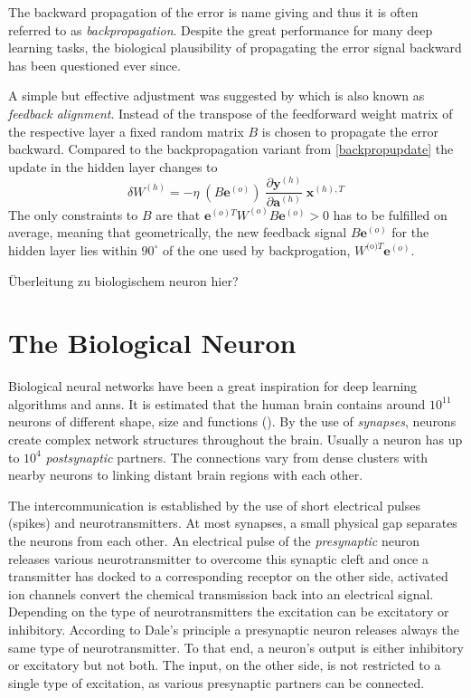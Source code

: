 The backward propagation of the error is name giving and thus it is often referred to as \textit{backpropagation}. Despite the great performance for many deep learning tasks, the biological plausibility of propagating the error signal backward has been questioned ever since.

A simple but effective adjustment was suggested by \cite{lillicrap2016random} which is also known as \textit{feedback alignment}. Instead of the transpose of the feedforward weight matrix of the respective layer a fixed random matrix $B$ is chosen to propagate the error backward. Compared to the backpropagation variant from \cref{backpropupdate} the update in the hidden layer changes to
\begin{equation}
\delta W^{(h)} = - \eta \;
(B \mathbf{e}^{(o)}) \;
\frac{\partial \mathbf{y}^{(h)}}{\partial \mathbf{a}^{(h)}} \;
\mathbf{x}^{(h),T}
\end{equation}
The only constraints to $B$ are that $\mathbf{e}^{(o)T} W^{(o)} B \mathbf{e}^{(o)} > 0$ has to be fulfilled on average, meaning that geometrically, the new feedback signal $B \mathbf{e}^{(o)}$ for the hidden layer lies within $90^{\circ}$ of the one used by backprogation, $W^{\text{(o)}T} \mathbf{e}^{(o)}$.

Überleitung zu biologischem neuron hier?

\section{The Biological Neuron}

Biological neural networks have been a great inspiration for deep learning algorithms and \glspl{ann}. It is estimated that the human brain contains around $10^{11}$ neurons of different shape, size and functions (\cite{numberofneurons}). By the use of \emph{synapses}, neurons create complex network structures throughout the brain. Usually a neuron has up to $10^4$ \emph{postsynaptic} partners. The connections vary from dense clusters with nearby neurons to linking distant brain regions with each other. 

The intercommunication is established by the use of short electrical pulses (spikes) and neurotransmitters. At most synapses, a small physical gap separates the neurons from each other. An electrical pulse of the \emph{presynaptic} neuron releases various neurotransmitter to overcome this synaptic cleft and once a transmitter has docked to a corresponding receptor on the other side, activated ion channels convert the chemical transmission back into an electrical signal. Depending on the type of neurotransmitters the excitation  can be excitatory or inhibitory. According to Dale's principle a presynaptic neuron releases always the same type of neurotransmitter. To that end, a neuron's output is either inhibitory or excitatory but not both. The input, on the other side, is not restricted to a single type of excitation, as various presynaptic partners can be connected.

